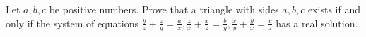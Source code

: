 Let $a,b,c$ be positive numbers. Prove that a triangle with sides $a,b,c$ exists if and only if the system of equations
$\frac{y}{z}+\frac{z}{y}=\frac{a}{x},\frac{z}{x}+\frac{x}{z}=\frac{b}{y},\frac{x}{y}+\frac{y}{x}=\frac{c}{z}$ has a real solution.
